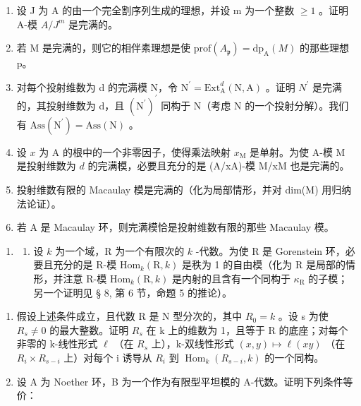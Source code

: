 \begin{enumerate}
\def\labelenumi{\alph{enumi})}
\setcounter{enumi}{1}
\item
  设 J 为 A 的由一个完全割序列生成的理想，并设 m 为一个整数 \(\geqslant 1\) 。证明 A-模 \(A/J^{m}\) 是完满的。
\item
  若 M 是完满的，则它的相伴素理想是使 \(\text{prof}(A_{\mathfrak{p}}) = \text{dp}_{\mathrm{A}}(M)\) 的那些理想 p。
\item
  对每个投射维数为 d 的完满模 N，令 \(\mathrm{N}^{\prime} = \mathrm{Ext}_{\mathrm{A}}^{d}(\mathrm{N}, \mathrm{A})\) 。证明 \(N^{\prime}\) 是完满的，其投射维数为 d，且 \((\mathrm{N}^{\prime})^{\prime}\) 同构于 N（考虑 N 的一个投射分解）。我们有 \(\mathrm{Ass}(\mathrm{N}^{\prime}) = \mathrm{Ass}(\mathrm{N})\) 。
\item
  设 \(x\) 为 A 的根中的一个非零因子，使得乘法映射 \(x_{\mathrm{M}}\) 是单射。为使 A-模 M 是投射维数为 \(d\) 的完满模，必要且充分的是 (A/xA)-模 M/xM 也是完满的。
\item
  投射维数有限的 Macaulay 模是完满的（化为局部情形，并对 dim(M) 用归纳法论证）。
\item
  若 A 是 Macaulay 环，则完满模恰是投射维数有限的那些 Macaulay 模。
\end{enumerate}

\begin{enumerate}
\def\labelenumi{\arabic{enumi})}
\setcounter{enumi}{4}
\tightlist
\item
  \begin{enumerate}
  \def\labelenumii{\alph{enumii})}
  \tightlist
  \item
    设 \(k\) 为一个域，R 为一个有限次的 \(k\) -代数。为使 R 是 Gorenstein 环，必要且充分的是 R-模 \(\mathrm{Hom}_{k}(\mathrm{R}, k)\) 是秩为 1 的自由模（化为 R 是局部的情形，并注意 R-模 \(\mathrm{Hom}_{k}(\mathrm{R}, k)\) 是内射的且含有一个同构于 \(\kappa_{\mathrm{R}}\) 的子模；另一个证明见 § 8, 第 6 节，命题 5 的推论）。
  \end{enumerate}
\end{enumerate}

\begin{enumerate}
\def\labelenumi{\alph{enumi})}
\setcounter{enumi}{1}
\item
  假设上述条件成立，且代数 R 是 N 型分次的，其中 \(R_{0} = k\) 。设 s 为使 \(R_{s} \neq 0\) 的最大整数。证明 \(R_{s}\) 在 k 上的维数为 1，且等于 R 的底座；对每个非零的 k-线性形式 \(\ell\) （在 \(R_{s}\) 上），k-双线性形式 \((x, y) \mapsto \ell(xy)\) （在 \(R_{i} \times R_{s- i}\) 上）对每个 i 诱导从 \(R_{i}\) 到 \(\operatorname{Hom}_{k}(R_{s-i}, k)\) 的一个同构。
\item
  设 A 为 Noether 环，B 为一个作为有限型平坦模的 A-代数。证明下列条件等价：
\end{enumerate}

